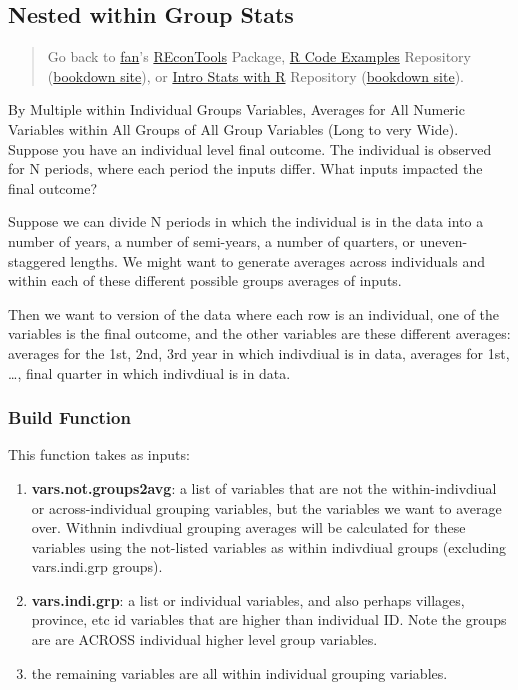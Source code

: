 \documentclass[
]{book}
\providecommand{\tightlist}{%
  \setlength{\itemsep}{0pt}\setlength{\parskip}{0pt}}
\begin{document}
\hypertarget{nested-within-group-stats}{%
\subsection{Nested within Group Stats}\label{nested-within-group-stats}}

\begin{quote}
Go back to \href{http://fanwangecon.github.io/}{fan}'s \href{https://fanwangecon.github.io/REconTools/}{REconTools} Package, \href{https://fanwangecon.github.io/R4Econ/}{R Code Examples} Repository (\href{https://fanwangecon.github.io/R4Econ/bookdown}{bookdown site}), or \href{https://fanwangecon.github.io/Stat4Econ/}{Intro Stats with R} Repository (\href{https://fanwangecon.github.io/Stat4Econ/bookdown}{bookdown site}).
\end{quote}

By Multiple within Individual Groups Variables, Averages for All Numeric Variables within All Groups of All Group Variables (Long to very Wide). Suppose you have an individual level final outcome. The individual is observed for N periods, where each period the inputs differ. What inputs impacted the final outcome?

Suppose we can divide N periods in which the individual is in the data into a number of years, a number of semi-years, a number of quarters, or uneven-staggered lengths. We might want to generate averages across individuals and within each of these different possible groups averages of inputs.

Then we want to version of the data where each row is an individual, one of the variables is the final outcome, and the other variables are these different averages: averages for the 1st, 2nd, 3rd year in which indivdiual is in data, averages for 1st, \ldots, final quarter in which indivdiual is in data.

\hypertarget{build-function}{%
\subsubsection{Build Function}\label{build-function}}

This function takes as inputs:

\begin{enumerate}
\def\labelenumi{\arabic{enumi}.}
\tightlist
\item
  \textbf{vars.not.groups2avg}: a list of variables that are not the within-indivdiual or across-individual grouping variables, but the variables we want to average over. Withnin indivdiual grouping averages will be calculated for these variables using the not-listed variables as within indivdiual groups (excluding vars.indi.grp groups).
\item
  \textbf{vars.indi.grp}: a list or individual variables, and also perhaps villages, province, etc id variables that are higher than individual ID. Note the groups are are ACROSS individual higher level group variables.
\item
  the remaining variables are all within individual grouping variables.
\end{enumerate}
\end{document}
